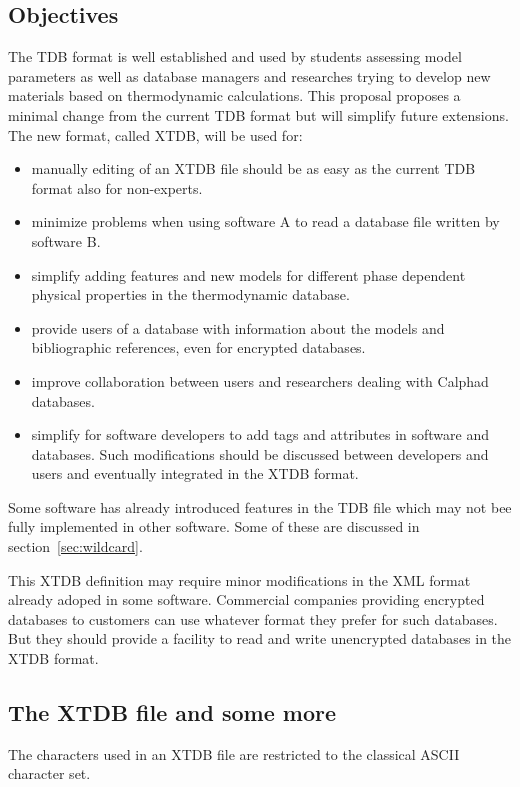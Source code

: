\documentclass{article}
\begin{document}
\subsection{Objectives}

The TDB format is well established and used by students assessing
model parameters as well as database managers and researches trying to
develop new materials based on thermodynamic calculations.  This
proposal proposes a minimal change from the current TDB format but
will simplify future extensions.  The new format, called XTDB, will be
used for:
\begin{itemize}
  \item manually editing of an XTDB file should be as easy as the
    current TDB format also for non-experts.
  \item minimize problems when using software A to read a database
    file written by software B.
  \item simplify adding features and new models for different phase
    dependent physical properties in the thermodynamic database.
  \item provide users of a database with information about the models
    and bibliographic references, even for encrypted databases.
  \item improve collaboration between users and researchers dealing
    with Calphad databases.
  \item simplify for software developers to add tags and attributes in
    software and databases.  Such modifications should be discussed
    between developers and users and eventually integrated in the XTDB
    format.
\end{itemize}

Some software has already introduced features in the TDB file which
may not bee fully implemented in other software.  Some of these are
discussed in section~\ref{sec:wildcard}.

This XTDB definition may require minor modifications in the XML format
already adoped in some software.  Commercial companies providing
encrypted databases to customers can use whatever format they prefer
for such databases.  But they should provide a facility to read and
write unencrypted databases in the XTDB format.

\subsection{The XTDB file and some more}

The characters used in an XTDB file are restricted to the classical
ASCII character set.
\end{document}

